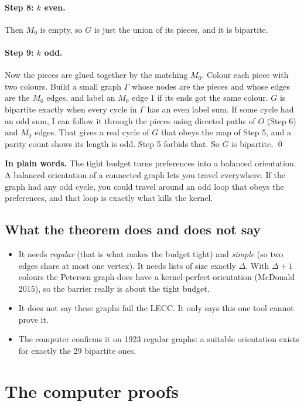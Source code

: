 \documentclass[11pt]{article}
\theoremstyle{plain}
\theoremstyle{definition}
\newcommand{\plain}[1]{\par\smallskip\noindent\colorbox{black!6}{\parbox{\dimexpr\linewidth-2\fboxsep}{\small\textbf{In plain words.} #1}}\par\smallskip}
\begin{document}
\paragraph{Step 8: $k$ even.} Then $M_0$ is empty, so $G$ is just the union of its pieces, and
it is bipartite.

\paragraph{Step 9: $k$ odd.} Now the pieces are glued together by the matching $M_0$. Colour each
piece with two colours. Build a small graph $\Gamma$ whose nodes are the pieces and whose edges
are the $M_0$ edges, and label an $M_0$ edge 1 if its ends got the same colour. $G$ is bipartite
exactly when every cycle in $\Gamma$ has an even label sum. If some cycle had an odd sum, I can
follow it through the pieces using directed paths of $O$ (Step 6) and $M_0$ edges. That gives a
real cycle of $G$ that obeys the map of Step 5, and a parity count shows its length is odd. Step
5 forbids that. So $G$ is bipartite. \qed

\plain{The tight budget turns preferences into a balanced orientation. A balanced orientation
of a connected graph lets you travel everywhere. If the graph had any odd cycle, you could
travel around an odd loop that obeys the preferences, and that loop is exactly what kills the
kernel.}

\subsection{What the theorem does and does not say}

\begin{itemize}[leftmargin=*]
  \item It needs \emph{regular} (that is what makes the budget tight) and \emph{simple} (so two
        edges share at most one vertex). It needs lists of size exactly $\Delta$. With
        $\Delta+1$ colours the Petersen graph does have a kernel-perfect orientation
        (McDonald 2015), so the barrier really is about the tight budget.
  \item It does not say these graphs fail the LECC. It only says this one tool cannot prove it.
  \item The computer confirms it on 1923 regular graphs: a suitable orientation exists for
        exactly the 29 bipartite ones.
\end{itemize}

\section{The computer proofs}
\end{document}
